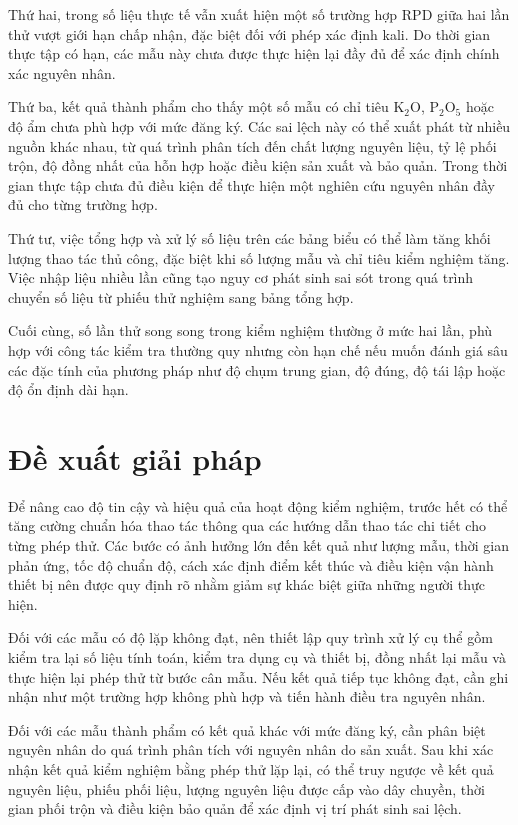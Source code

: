 Thứ hai, trong số liệu thực tế vẫn xuất hiện một số trường hợp RPD giữa hai lần thử vượt giới hạn chấp nhận, đặc biệt đối với phép xác định kali. Do thời gian thực tập có hạn, các mẫu này chưa được thực hiện lại đầy đủ để xác định chính xác nguyên nhân.

Thứ ba, kết quả thành phẩm cho thấy một số mẫu có chỉ tiêu K$_2$O, P$_2$O$_5$ hoặc độ ẩm chưa phù hợp với mức đăng ký. Các sai lệch này có thể xuất phát từ nhiều nguồn khác nhau, từ quá trình phân tích đến chất lượng nguyên liệu, tỷ lệ phối trộn, độ đồng nhất của hỗn hợp hoặc điều kiện sản xuất và bảo quản. Trong thời gian thực tập chưa đủ điều kiện để thực hiện một nghiên cứu nguyên nhân đầy đủ cho từng trường hợp.

Thứ tư, việc tổng hợp và xử lý số liệu trên các bảng biểu có thể làm tăng khối lượng thao tác thủ công, đặc biệt khi số lượng mẫu và chỉ tiêu kiểm nghiệm tăng. Việc nhập liệu nhiều lần cũng tạo nguy cơ phát sinh sai sót trong quá trình chuyển số liệu từ phiếu thử nghiệm sang bảng tổng hợp.

Cuối cùng, số lần thử song song trong kiểm nghiệm thường ở mức hai lần, phù hợp với công tác kiểm tra thường quy nhưng còn hạn chế nếu muốn đánh giá sâu các đặc tính của phương pháp như độ chụm trung gian, độ đúng, độ tái lập hoặc độ ổn định dài hạn.

\section{Đề xuất giải pháp}

Để nâng cao độ tin cậy và hiệu quả của hoạt động kiểm nghiệm, trước hết có thể tăng cường chuẩn hóa thao tác thông qua các hướng dẫn thao tác chi tiết cho từng phép thử. Các bước có ảnh hưởng lớn đến kết quả như lượng mẫu, thời gian phản ứng, tốc độ chuẩn độ, cách xác định điểm kết thúc và điều kiện vận hành thiết bị nên được quy định rõ nhằm giảm sự khác biệt giữa những người thực hiện.

Đối với các mẫu có độ lặp không đạt, nên thiết lập quy trình xử lý cụ thể gồm kiểm tra lại số liệu tính toán, kiểm tra dụng cụ và thiết bị, đồng nhất lại mẫu và thực hiện lại phép thử từ bước cân mẫu. Nếu kết quả tiếp tục không đạt, cần ghi nhận như một trường hợp không phù hợp và tiến hành điều tra nguyên nhân.

Đối với các mẫu thành phẩm có kết quả khác với mức đăng ký, cần phân biệt nguyên nhân do quá trình phân tích với nguyên nhân do sản xuất. Sau khi xác nhận kết quả kiểm nghiệm bằng phép thử lặp lại, có thể truy ngược về kết quả nguyên liệu, phiếu phối liệu, lượng nguyên liệu được cấp vào dây chuyền, thời gian phối trộn và điều kiện bảo quản để xác định vị trí phát sinh sai lệch.

